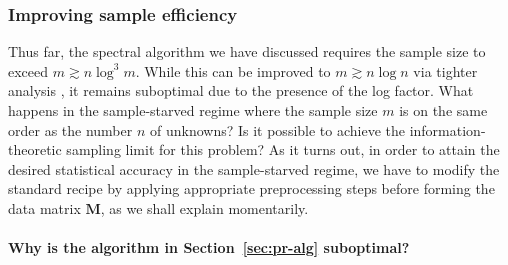 \subsubsection{Improving sample efficiency}


Thus far, the spectral algorithm we have discussed requires the sample size to exceed $m \gtrsim n  \log^3 m$.
While this can be improved to $m \gtrsim n \log n$ via tighter analysis \citep{candes2015phase,ma2017implicit},
it remains suboptimal due to the presence of the log factor.
What happens in the sample-starved regime where the sample size $m$ is on the same order as the number $n$ of unknowns?
Is it possible to achieve the information-theoretic sampling limit for this problem?
As it turns out, in order to attain the desired statistical accuracy in the sample-starved regime,
we have to modify the standard recipe by applying appropriate preprocessing steps before forming the data matrix $\bm{M}$, as we shall explain momentarily.



\paragraph{Why is the algorithm in Section~\ref{sec:pr-alg} suboptimal?}

